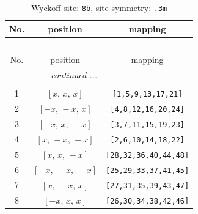 \documentclass[fleqn,8pt]{jsarticle}
\begin{document}
\renewcommand{\arraystretch}{1.2}
\begin{longtable}{ccc}
\caption{Wyckoff site: {\tt 8b}, site symmetry: {\tt .3m}}
 \\
 \hline \hline
No. & position & mapping \\ \hline \endfirsthead

\multicolumn{2}{l}{\tablename\ \thetable{}} \\
 \hline \hline
No. & position & mapping \\ \hline \endhead

 \hline \hline
\multicolumn{2}{r}{\footnotesize\it continued ...} \\ \endfoot

 \hline \hline
\multicolumn{2}{r}{} \\ \endlastfoot

1 & $\left[ x,\, x,\, x \right]$ & {\tt [1,5,9,13,17,21]} \\ \hline
2 & $\left[ - x,\, - x,\, x \right]$ & {\tt [4,8,12,16,20,24]} \\ \hline
3 & $\left[ - x,\, x,\, - x \right]$ & {\tt [3,7,11,15,19,23]} \\ \hline
4 & $\left[ x,\, - x,\, - x \right]$ & {\tt [2,6,10,14,18,22]} \\ \hline
5 & $\left[ x,\, x,\, - x \right]$ & {\tt [28,32,36,40,44,48]} \\ \hline
6 & $\left[ - x,\, - x,\, - x \right]$ & {\tt [25,29,33,37,41,45]} \\ \hline
7 & $\left[ x,\, - x,\, x \right]$ & {\tt [27,31,35,39,43,47]} \\ \hline
8 & $\left[ - x,\, x,\, x \right]$ & {\tt [26,30,34,38,42,46]} \\
\end{longtable}
\renewcommand{\arraystretch}{1.2}
\end{document}
